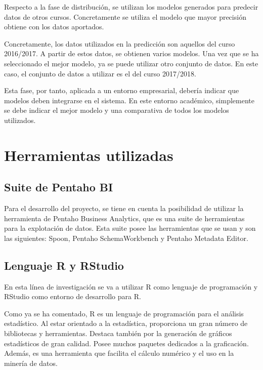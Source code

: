 Respecto a la fase de distribución, se utilizan los modelos generados para predecir datos de otros cursos. Concretamente se utiliza el modelo que mayor precisión obtiene con los datos aportados.

Concretamente, los datos utilizados en la predicción son aquellos del curso 2016/2017. A partir de estos datos, se obtienen varios modelos. Una vez que se ha seleccionado el mejor modelo, ya se puede utilizar otro conjunto de datos. En este caso, el conjunto de datos a utilizar es el del curso 2017/2018.

Esta fase, por tanto, aplicada a un entorno empresarial, debería indicar que modelos deben integrarse en el sistema. En este entorno académico, simplemente se debe indicar el mejor modelo y una comparativa de todos los modelos utilizados.





\section{Herramientas utilizadas}
\subsection{Suite de Pentaho BI}
Para el desarrollo del proyecto, se tiene en cuenta la posibilidad de utilizar la herramienta de Pentaho Business Analytics, que es una suite de herramientas para la explotación de datos. Esta suite posee las herramientas que se usan y son las siguientes: Spoon, Pentaho SchemaWorkbench y Pentaho Metadata Editor.

\subsection{Lenguaje R y RStudio}
En esta línea de investigación se va a utilizar R como lenguaje de programación y RStudio como entorno de desarrollo para R.

Como ya se ha comentado, R es un lenguaje de programación para el análisis estadístico. Al estar orientado a la estadística, proporciona un gran número de bibliotecas y herramientas. Destaca también por la generación de gráficos estadísticos de gran calidad. Posee muchos paquetes dedicados a la graficación. Además, es una herramienta que facilita el cálculo numérico y el uso en la minería de datos. \cite{emanuel2014}

